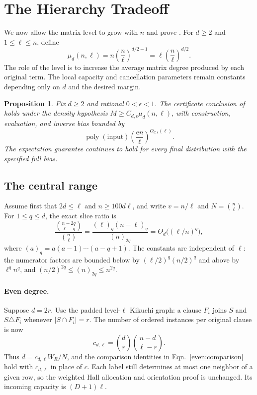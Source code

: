 \documentclass[letterpaper,11pt]{article}
\newtheorem{proposition}[theorem]{Proposition}
\theoremstyle{definition}
\newcommand{\abs}[1]{\left|#1\right|}
\DeclareMathOperator{\poly}{poly}
\begin{document}


\section{The Hierarchy Tradeoff}\label{sec:hierarchy}

We now allow the matrix level to grow with $n$ and prove
. For $d\geq2$ and $1\leq\ell\leq n$, define
\begin{equation}\label{hierarchy:scale}
 \mu_d(n,\ell)=n\left(\frac n\ell\right)^{d/2-1}
              =\ell\left(\frac n\ell\right)^{d/2}.
\end{equation}
The role of the level is to increase the average matrix degree produced
by each original term. The local capacity and cancellation parameters
remain constants depending only on $d$ and the desired margin.

\begin{proposition}\label{hierarchy:signing}
Fix $d\geq2$ and rational $0<\epsilon<1$. The certificate conclusion
of  holds under the density hypothesis
$M\geq C_{d,\epsilon}\mu_d(n,\ell)$, with construction, evaluation,
and inverse bias bounded by
\begin{equation}\label{hierarchy:cost}
 \poly(\text{input})
 \left(\frac{\mathrm e n}{\ell}\right)^{O_{d,\epsilon}(\ell)}.
\end{equation}
The expectation guarantee continues to hold for every final distribution
with the specified full bias.
\end{proposition}

\subsection{The central range}

Assume first that $2d\leq\ell$ and $n\geq100d\ell$, and write
$v=n/\ell$ and $N=\binom n\ell$. For $1\leq q\leq d$, the exact
slice ratio is
\begin{equation}\label{hierarchy:slice-ratio}
 \frac{\binom{n-2q}{\ell-q}}{\binom n\ell}
 =\frac{(\ell)_q(n-\ell)_q}{(n)_{2q}}
 =\Theta_d\bigl((\ell/n)^q\bigr),
\end{equation}
where $(a)_q=a(a-1)\cdots(a-q+1)$.
The constants are independent of $\ell$: the numerator factors are
bounded below by $(\ell/2)^q(n/2)^q$ and above by $\ell^q n^q$,
and $(n/2)^{2q}\leq(n)_{2q}\leq n^{2q}$.

\paragraph{Even degree.}
Suppose $d=2r$. Use the padded level-$\ell$ Kikuchi graph: a clause
$F_i$ joins $S$ and $S\triangle F_i$ whenever $\abs{S\cap F_i}=r$.
The number of ordered instances per original clause is now
\[
 c_{d,\ell}=\binom dr\binom{n-d}{\ell-r}.
\]
Thus $\overline d=c_{d,\ell}W_R/N$, and the comparison identities in
Eqn.~\eqref{even:comparison} hold with $c_{d,\ell}$ in place of $c$.
Each label still determines at most one neighbor of a given row, so
the weighted Hall allocation and orientation proof is unchanged.
Its incoming capacity is $(D+1)\ell$.
\end{document}
